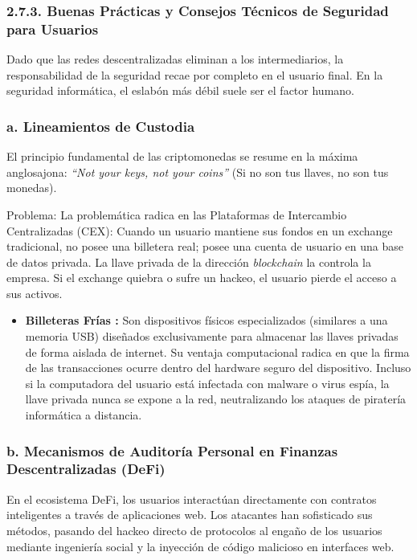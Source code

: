 \documentclass[12pt,a4paper]{article}
\begin{document}
\subsubsection*{2.7.3. Buenas Prácticas y Consejos Técnicos de Seguridad para Usuarios}

Dado que las redes descentralizadas eliminan a los intermediarios, la responsabilidad de la seguridad recae por completo en el usuario final. En la seguridad informática, el eslabón más débil suele ser el factor humano.

\subsubsection*{a. Lineamientos de Custodia}

El principio fundamental de las criptomonedas se resume en la máxima anglosajona: \textit{``Not your keys, not your coins''} (Si no son tus llaves, no son tus monedas).

Problema: La problemática radica en las Plataformas de Intercambio Centralizadas (CEX): Cuando un usuario mantiene sus fondos en un exchange tradicional, no posee una billetera real; posee una cuenta de usuario en una base de datos privada. La llave privada de la dirección \textit{blockchain} la controla la empresa. Si el exchange quiebra o sufre un hackeo, el usuario pierde el acceso a sus activos.

\begin{itemize}
  \item \textbf{Billeteras Frías :} Son dispositivos físicos especializados (similares a una memoria USB) diseñados exclusivamente para almacenar las llaves privadas de forma aislada de internet. Su ventaja computacional radica en que la firma de las transacciones ocurre dentro del hardware seguro del dispositivo. Incluso si la computadora del usuario está infectada con malware o virus espía, la llave privada nunca se expone a la red, neutralizando los ataques de piratería informática a distancia.
\end{itemize}

\subsubsection*{b. Mecanismos de Auditoría Personal en Finanzas Descentralizadas (DeFi)}

En el ecosistema DeFi, los usuarios interactúan directamente con contratos inteligentes a través de aplicaciones web. Los atacantes han sofisticado sus métodos, pasando del hackeo directo de protocolos al engaño de los usuarios mediante ingeniería social y la inyección de código malicioso en interfaces web.
\end{document}
